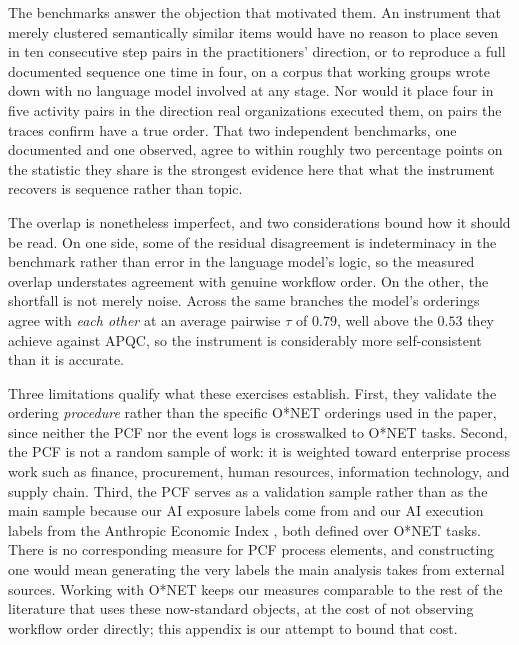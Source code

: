 The benchmarks answer the objection that motivated them.
An instrument that merely clustered semantically similar items would have no reason to place seven in ten
consecutive step pairs in the practitioners' direction, or to reproduce a full documented sequence one time in
four, on a corpus that working groups wrote down with no language model involved at any stage.
Nor would it place four in five activity pairs in the direction real organizations executed them, on pairs the
traces confirm have a true order.
That two independent benchmarks, one documented and one observed, agree to within roughly two percentage
points on the statistic they share is the strongest evidence here that what the instrument recovers is
sequence rather than topic.

The overlap is nonetheless imperfect, and two considerations bound how it should be read.
On one side, some of the residual disagreement is indeterminacy in the benchmark rather than error in the
language model's logic, so the measured overlap understates agreement with genuine workflow order.
On the other, the shortfall is not merely noise.
Across the same branches the model's orderings agree with \emph{each other} at an average pairwise $\tau$ of
$0.79$, well above the $0.53$ they achieve against APQC, so the instrument is considerably more
self-consistent than it is accurate.

Three limitations qualify what these exercises establish.
First, they validate the ordering \emph{procedure} rather than the specific O*NET orderings used in the paper,
since neither the PCF nor the event logs is crosswalked to O*NET tasks.
Second, the PCF is not a random sample of work: it is weighted toward enterprise process work such as finance,
procurement, human resources, information technology, and supply chain.
Third, the PCF serves as a validation sample rather than as the main sample because our AI exposure labels
come from \citet{eloundou2023gpts} and our AI execution labels from the Anthropic Economic Index
\citep{handa2025economictasksperformedai}, both defined over O*NET tasks.
There is no corresponding measure for PCF process elements, and constructing one would mean generating the
very labels the main analysis takes from external sources.
Working with O*NET keeps our measures comparable to the rest of the literature that uses these now-standard
objects, at the cost of not observing workflow order directly; this appendix is our attempt to bound that
cost.
